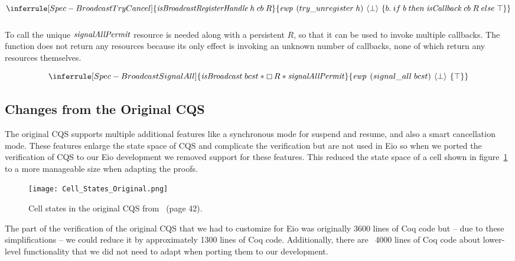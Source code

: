 \[
  \inferrule[Spec-BroadcastTryCancel]
  { \emph{isBroadcastRegisterHandle}\; h\; cb\; R }
  { \ewp{try\_unregister\; h}{\bot}{b.\; if\; b\; then\; \gsIsCb{}\; cb\; R\; else\; \top}}
\]

\subsubsection{}
\label{sec:broadcast-spec-signal-all}

To call  the unique \(\mathit{signalAllPermit}{}\) resource is needed along with a persistent \(R\), so that it can be used to invoke multiple callbacks.
The function does not return any resources because its only effect is invoking an unknown number of callbacks, none of which return any resources themselves.

\[
  \inferrule[Spec-BroadcastSignalAll]
  { \gsIsBcst{}\; bcst \ast \always R \ast \gssignal{}}
  { \ewp{signal\_all\; bcst}{\bot}{\top} }
\]

\subsection{Changes from the Original CQS}
\label{sec:broadcast-spec-removed-features}

The original CQS supports multiple additional features like a synchronous mode for suspend and resume, and also a smart cancellation mode.
These features enlarge the state space of CQS and complicate the verification but are not used in Eio so when we ported the verification of CQS to our Eio development we removed support for these features.
This reduced the state space of a cell shown in figure~\ref{fig:cqs-cell-states-original} to a more manageable size when adapting the proofs.

\begin{figure}[ht]
  \texttt{[image: Cell\_States\_Original.png]}
  \caption{Cell states in the original CQS from~\cite{koval2023cqs} (page 42).}
  \label{fig:cqs-cell-states-original}
\end{figure}

The part of the verification of the original CQS that we had to customize for Eio was originally 3600 lines of Coq code but -- due to these simplifications -- we could reduce it by approximately 1300 lines of Coq code.
Additionally, there are ~4000 lines of Coq code about lower-level functionality that we did not need to adapt when porting them to our development.

